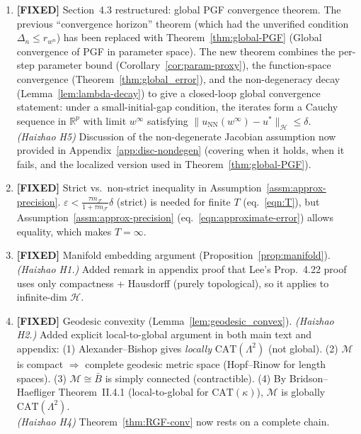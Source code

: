 \documentclass[twoside,11pt]{article}
\newcommand{\R}{\mathbb{R}}
\newcommand{\NN}{\mathrm{NN}}
\newcommand{\calF}{\mathcal{F}}
\newcommand{\calH}{\mathcal{H}}
\newcommand{\calM}{\mathcal{M}}
\begin{document}
\begin{enumerate}
\item {\color{green!50!black}\textbf{[FIXED]} Section~4.3 restructured: global PGF convergence theorem.}
    The previous ``convergence horizon'' theorem (which had the unverified condition $\Delta_n\le r_{w^n}$)
    has been replaced with Theorem~\ref{thm:global-PGF} (Global convergence of PGF in parameter space).
    The new theorem combines the per-step parameter bound (Corollary~\ref{cor:param-proxy}),
    the function-space convergence (Theorem~\ref{thm:global_error}), and the non-degeneracy decay
    (Lemma~\ref{lem:lambda-decay}) to give a closed-loop global convergence statement:
    under a small-initial-gap condition, the iterates form a Cauchy sequence in $\R^p$ with limit
    $w^\infty$ satisfying $\|u_\NN(w^\infty)-u^*\|_\calH\le\delta$.\\
    \emph{(Haizhao H5)} Discussion of the non-degenerate Jacobian assumption now provided
    in Appendix~\ref{app:disc-nondegen} (covering when it holds, when it fails, and the
    localized version used in Theorem~\ref{thm:global-PGF}).

\item {\color{green!50!black}\textbf{[FIXED]} Strict vs.\ non-strict inequality in Assumption~\ref{assm:approx-precision}.}
    $\varepsilon < \frac{\tau m_\calF}{1+\tau m_\calF}\delta$ (strict) is needed for finite $T$
    (eq.~\eqref{eqn:T}), but Assumption~\ref{assm:approx-precision} (eq.~\eqref{eqn:approximate-error})
    allows equality, which makes $T=\infty$.

\item {\color{green!50!black}\textbf{[FIXED]} Manifold embedding argument (Proposition~\ref{prop:manifold}).}
    \emph{(Haizhao H1.)}
    Added remark in appendix proof that Lee's Prop.~4.22 proof uses only
    compactness + Hausdorff (purely topological), so it applies to infinite-dim $\calH$.

\item {\color{green!50!black}\textbf{[FIXED]} Geodesic convexity (Lemma~\ref{lem:geodesic_convex}).}
    \emph{(Haizhao H2.)}
    Added explicit local-to-global argument in both main text and appendix:
    (1) Alexander--Bishop gives \emph{locally} $\mathrm{CAT}(\Lambda^2)$ (not global).
    (2) $\calM$ is compact $\Rightarrow$ complete geodesic metric space (Hopf--Rinow for length spaces).
    (3) $\calM\cong\bar B$ is simply connected (contractible).
    (4) By Bridson--Haefliger Theorem~II.4.1 (local-to-global for $\mathrm{CAT}(\kappa)$),
    $\calM$ is globally $\mathrm{CAT}(\Lambda^2)$.\\
    \emph{(Haizhao H4)} Theorem~\ref{thm:RGF-conv} now rests on a complete chain.


\end{enumerate}
\end{document}
